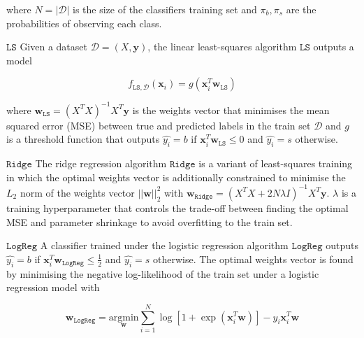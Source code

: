 \documentclass[10pt,conference,compsocconf]{IEEEtran}
\newcommand{\parabf}[1]{\vspace{1mm}\noindent\textbf{#1}}
\newcommand{\Data}{\mathcal{D}}
\newcommand{\features}{\mathbf{x}_i}
\newcommand{\target}{y_i}
\newcommand{\targetvector}{\mathbf{y}}
\newcommand{\weights}{\mathbf{w}}
\newcommand{\classifier}[2]{f_{#1, #2}}
\newcommand{\LeastSquares}{\mathtt{LS}}
\newcommand{\Ridge}{\mathtt{Ridge}}
\newcommand{\LogReg}{\mathtt{LogReg}}
\begin{document}
where $N = |\Data|$ is the size of the classifiers training set and $\pi_b, \pi_s$ are the probabilities of observing each class. 

\parabf{$\LeastSquares$} Given a dataset $\Data = (X, \targetvector)$, the linear least-squares algorithm $\LeastSquares$ outputs a model

\vspace*{-4mm}
\begin{equation}
	\classifier{\LeastSquares}{\Data}(\features) = g(\features^T \weights_{\LeastSquares})
\end{equation}

where $\weights_{\LeastSquares} = (X^T X)^{-1}X^T \targetvector$ is the weights vector that minimises the mean squared error (MSE) between true and predicted labels in the train set $\Data$ and $g$ is a threshold function that outputs $\hat{\target} = b$ if $\features^T \weights_{\LeastSquares} \leq 0$ and $\hat{\target} = s$ otherwise.

\parabf{$\Ridge$} The ridge regression algorithm $\Ridge$ is a variant of least-squares training in which the optimal weights vector is additionally constrained to minimise the $L_2$ norm of the weights vector $||\weights||_2^2$ with $\weights_\Ridge = (X^T X + 2N\lambda I)^{-1}X^T \targetvector$. $\lambda$ is a training hyperparameter that controls the trade-off between finding the optimal MSE and parameter shrinkage to avoid overfitting to the train set.

\parabf{$\LogReg$} A classifier trained under the logistic regression algorithm $\LogReg$ outputs $\hat{\target} = b$ if $\features^T \weights_{\LogReg} \leq \frac{1}{2}$ and $\hat{\target} = s$ otherwise. The optimal weights vector is found by minimising the negative log-likelihood of the train set under a logistic regression model with

\vspace*{-4mm}
\begin{equation}
	\weights_\LogReg = \underset{\weights}{\text{argmin}} \sum_{i=1}^{N} \log [ 1 + \exp(\features^T\weights) ] - \target\features^T\weights
\end{equation} 
\end{document}
